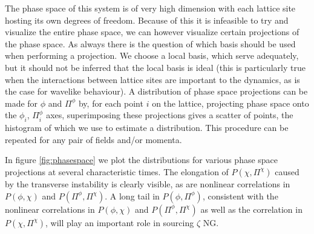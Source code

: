

The phase space of this system is of very high dimension with each lattice site hosting its own degrees of freedom.
Because of this it is infeasible to try and visualize the entire phase space, we can however visualize certain projections of the phase space.
As always there is the question of which basis should be used when performing a projection.
We choose a local basis, which serve adequately, but it should not be inferred that the local basis is ideal (this is particularly true when the interactions between lattice sites are important to the dynamics, as is the case for wavelike behaviour).
A distribution of phase space projections can be made for $\phi$ and $\Pi^\phi$ by, for each point $i$ on the lattice, projecting phase space onto the $\phi_i$, $\Pi^\phi_i$ axes, superimposing these projections gives a scatter of points, the histogram of which we use to estimate a distribution.
This procedure can be repeated for any pair of fields and/or momenta.

In figure \ref{fig:phasespace} we plot the distributions for various phase space projections at several characteristic times.
The elongation of $P(\chi,\Pi^\chi)$ caused by the transverse instability is clearly visible, as are nonlinear correlations in $P(\phi,\chi)$ and $P(\Pi^\phi,\Pi^\chi)$.
A long tail in $P(\phi,\Pi^\phi)$, consistent with the nonlinear correlations in $P(\phi,\chi)$ and $P(\Pi^\phi,\Pi^\chi)$ as well as the correlation in $P(\chi,\Pi^\chi)$, will play an important role in sourcing $\zeta$ NG.


